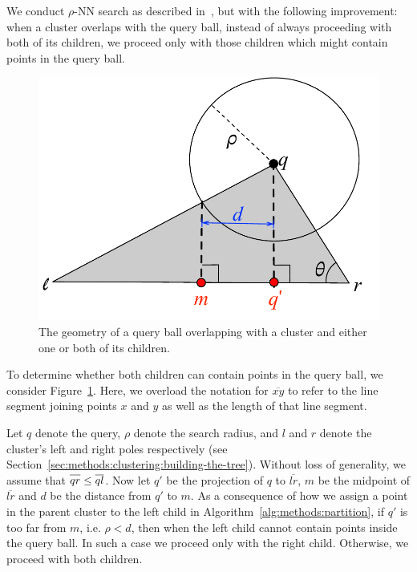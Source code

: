 We conduct $\rho$-NN search as described in~\cite{ishaq2019clustered}, but with the following improvement:
when a cluster overlaps with the query ball, instead of always proceeding with both of its children, we proceed only with those children which might contain points in the query ball.

\begin{figure}[ht!]
    \centering
    \includegraphics[scale=0.8]{images/geometry/overlapping-children-3.pdf}
    \caption{The geometry of a query ball overlapping with a cluster and either one or both of its children.}
    \label{fig:methods:overlapping-children}
\end{figure}

To determine whether both children can contain points in the query ball, we consider Figure~\ref{fig:methods:overlapping-children}.
Here, we overload the notation for $\overline{x y}$ to refer to the line segment joining points $x$ and $y$ as well as the length of that line segment.

Let $q$ denote the query, $\rho$ denote the search radius, and $l$ and $r$ denote the cluster's left and right poles respectively (see Section~\ref{sec:methods:clustering:building-the-tree}).
Without loss of generality, we assume that $\overline{q r \vphantom{l}} \leq \overline{q l}$.
Now let $q'$ be the projection of $q$ to $\overline{l r}$, $m$ be the midpoint of $\overline{l r}$ and $d$ be the distance from $q'$ to $m$.
As a consequence of how we assign a point in the parent cluster to the left child in Algorithm~\ref{alg:methods:partition}, if $q'$ is too far from $m$, i.e. $\rho < d$, then when the left child cannot contain points inside the query ball.
In such a case we proceed only with the right child.
Otherwise, we proceed with both children.

